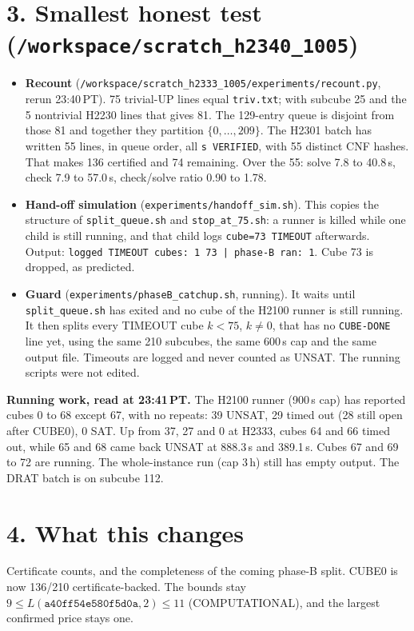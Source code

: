\documentclass[11pt]{article}
\begin{document}
\section*{3. Smallest honest test (\texttt{/workspace/scratch\_h2340\_1005})}
\begin{itemize}
\item \textbf{Recount} (\texttt{/workspace/scratch\_h2333\_1005/experiments/recount.py}, rerun 23:40\,PT). 75 trivial-UP lines equal \texttt{triv.txt}; with subcube 25 and the 5 nontrivial H2230 lines that gives 81. The 129-entry queue is disjoint from those 81 and together they partition $\{0,\dots,209\}$. The H2301 batch has written 55 lines, in queue order, all \texttt{s VERIFIED}, with 55 distinct CNF hashes. That makes 136 certified and 74 remaining. Over the 55: solve 7.8 to 40.8\,s, check 7.9 to 57.0\,s, check/solve ratio 0.90 to 1.78.
\item \textbf{Hand-off simulation} (\texttt{experiments/handoff\_sim.sh}). This copies the structure of \texttt{split\_queue.sh} and \texttt{stop\_at\_75.sh}: a runner is killed while one child is still running, and that child logs \texttt{cube=73 TIMEOUT} afterwards. Output: \texttt{logged TIMEOUT cubes: 1 73 | phase-B ran: 1}. Cube 73 is dropped, as predicted.
\item \textbf{Guard} (\texttt{experiments/phaseB\_catchup.sh}, running). It waits until \texttt{split\_queue.sh} has exited and no cube of the H2100 runner is still running. It then splits every TIMEOUT cube $k<75$, $k\ne 0$, that has no \texttt{CUBE-DONE} line yet, using the same 210 subcubes, the same 600\,s cap and the same output file. Timeouts are logged and never counted as UNSAT. The running scripts were not edited.
\end{itemize}

\textbf{Running work, read at 23:41\,PT.} The H2100 runner (900\,s cap) has reported cubes 0 to 68 except 67, with no repeats: 39 UNSAT, 29 timed out (28 still open after CUBE0), 0 SAT. Up from 37, 27 and 0 at H2333, cubes 64 and 66 timed out, while 65 and 68 came back UNSAT at 888.3\,s and 389.1\,s. Cubes 67 and 69 to 72 are running. The whole-instance run (cap 3\,h) still has empty output. The DRAT batch is on subcube 112.

\section*{4. What this changes}
Certificate counts, and the completeness of the coming phase-B split. CUBE0 is now 136/210 certificate-backed. The bounds stay $9\le L(\texttt{a40ff54e580f5d0a},2)\le 11$ (COMPUTATIONAL), and the largest confirmed price stays one.
\end{document}
